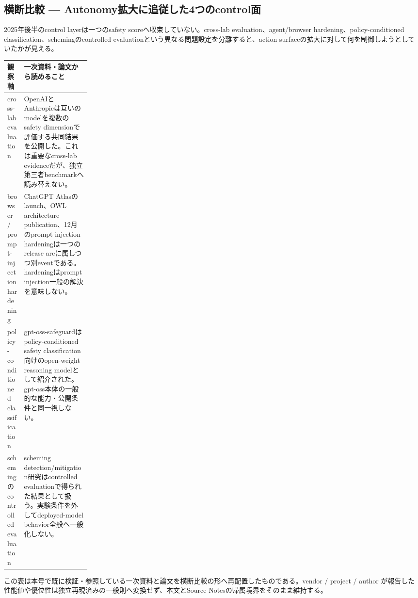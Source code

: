 \subsection*{横断比較 — Autonomy拡大に追従した4つのcontrol面}
2025年後半のcontrol layerは一つのsafety scoreへ収束していない。cross-lab evaluation、agent/browser hardening、policy-conditioned classification、schemingのcontrolled evaluationという異なる問題設定を分離すると、action surfaceの拡大に対して何を制御しようとしていたかが見える。
\medskip
\begin{center}
\small
\renewcommand{\arraystretch}{1.16}
\begin{tabularx}{\linewidth}{@{}p{0.20\linewidth}X@{}}
\toprule
観察軸 & 一次資料・論文から読めること \\
\midrule
cross-lab evaluation & OpenAIとAnthropicは互いのmodelを複数のsafety dimensionで評価する共同結果を公開した。これは重要なcross-lab evidenceだが、独立第三者benchmarkへ読み替えない。 \cite{src-ad13fe7d3321} \\
browser / prompt-injection hardening & ChatGPT Atlasのlaunch、OWL architecture publication、12月のprompt-injection hardeningは一つのrelease arcに属しつつ別eventである。hardeningはprompt injection一般の解決を意味しない。 \cite{src-3556c47e80db,src-0ad9fbef8c87,src-240a05c02f85} \\
policy-conditioned classification & gpt-oss-safeguardはpolicy-conditioned safety classification向けのopen-weight reasoning modelとして紹介された。gpt-oss本体の一般的な能力・公開条件と同一視しない。 \cite{src-2081c76ea2b4} \\
schemingのcontrolled evaluation & scheming detection/mitigation研究はcontrolled evaluationで得られた結果として扱う。実験条件を外してdeployed-model behavior全般へ一般化しない。 \cite{src-bef6cbe2a83e} \\
\bottomrule
\end{tabularx}
\renewcommand{\arraystretch}{1.0}
\end{center}
\normalsize
\begin{claimboundary}[この比較の境界]
この表は本号で既に検証・参照している一次資料と論文を横断比較の形へ再配置したものである。vendor / project / author が報告した性能値や優位性は独立再現済みの一般則へ変換せず、本文とSource Notesの帰属境界をそのまま維持する。
\end{claimboundary}
